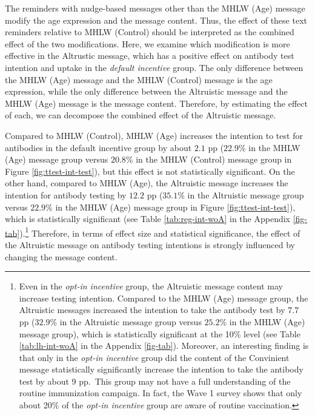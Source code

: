 \documentclass[
]{article}
\begin{document}
The reminders with nudge-based messages other than the MHLW (Age) message modify the age expression and the message content. Thus, the effect of these text reminders relative to MHLW (Control) should be interpreted as the combined effect of the two modifications. Here, we examine which modification is more effective in the Altrustic message, which has a positive effect on antibody test intention and uptake in the \emph{default incentive} group. The only difference between the MHLW (Age) message and the MHLW (Control) message is the age expression, while the only difference between the Altruistic message and the MHLW (Age) message is the message content. Therefore, by estimating the effect of each, we can decompose the combined effect of the Altruistic message.

Compared to MHLW (Control), MHLW (Age) increases the intention to test for antibodies in the default incentive group by about \(2.1\) pp (\(22.9\)\% in the MHLW (Age) message group versus \(20.8\)\% in the MHLW (Control) message group in Figure \ref{fig:ttest-int-test}), but this effect is not statistically significant. On the other hand, compared to MHLW (Age), the Altruistic message increases the intention for antibody testing by \(12.2\) pp (\(35.1\)\% in the Altruistic message group versus \(22.9\)\% in the MHLW (Age) message group in Figure \ref{fig:ttest-int-test}), which is statistically significant (see Table \ref{tab:reg-int-woA} in the Appendix \ref{fig-tab}).\footnote{Even in the \emph{opt-in incentive} group, the Altruistic message content may increase testing intention. Compared to the MHLW (Age) message group, the Altruistic messages increased the intention to take the antibody test by \(7.7\) pp (\(32.9\)\% in the Altruistic message group versus \(25.2\)\% in the MHLW (Age) message group), which is statistically significant at the 10\% level (see Table \ref{tab:lh-int-woA} in the Appendix \ref{fig-tab}). Moreover, an interesting finding is that only in the \emph{opt-in incentive} group did the content of the Convinient message statistically significantly increase the intention to take the antibody test by about 9 pp.~This group may not have a full understanding of the routine immunization campaign. In fact, the Wave 1 survey shows that only about 20\% of the \emph{opt-in incentive} group are aware of routine vaccination.} Therefore, in terms of effect size and statistical significance, the effect of the Altruistic message on antibody testing intentions is strongly influenced by changing the message content.
\end{document}

